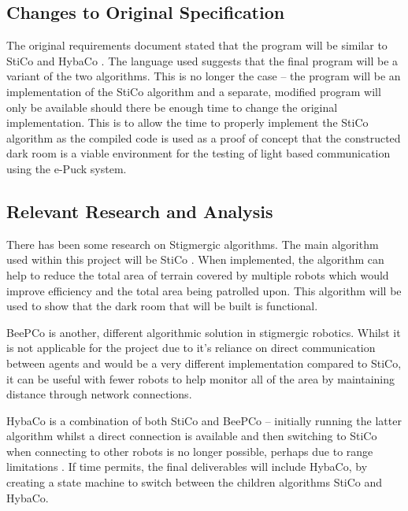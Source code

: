 \subsection{Changes to Original Specification} \label{desReqChanges}
The original requirements document stated that the program will be similar to 
StiCo and HybaCo \cite{myReq}.  The language used suggests that the final
program will be a variant of the two algorithms.  This is no longer the case
-- the program will be an implementation of the StiCo algorithm and a separate,
modified program will only be available should there be enough time to
change the original implementation.  This is to allow the time to properly
implement the StiCo algorithm as the compiled code is used as a proof of
concept that the constructed dark room is a viable environment for the testing
of light based communication using the e-Puck system.

\subsection{Relevant Research and Analysis} \label{desResAnal}
There has been some research on Stigmergic algorithms.  The main algorithm used
within this project will be StiCo
\cite{Ranjbar-Sahraei2012,Ranjbar-Sahraei2012Demo,Ranjbar-Sahraei2013}.
When implemented, the algorithm can help to reduce the total area of terrain
covered by multiple robots which would improve efficiency and the total area 
being patrolled upon.  This algorithm will be used to show that the dark room
that will be built is functional.

BeePCo is another, different algorithmic solution in stigmergic robotics.  
Whilst it is not applicable for the project due to it's reliance on direct
communication between agents and would be a very different implementation 
compared to StiCo, it can be useful with fewer robots to help monitor all of the
area by maintaining distance through network connections.

HybaCo is a combination of both StiCo and BeePCo -- initially running the latter
algorithm whilst a direct connection is available and then switching to StiCo
when connecting to other robots is no longer possible, perhaps due to range
limitations \cite{Broecker2015}.  If time permits, the final deliverables will
include HybaCo, by creating a state machine to switch between the children
algorithms StiCo and HybaCo.